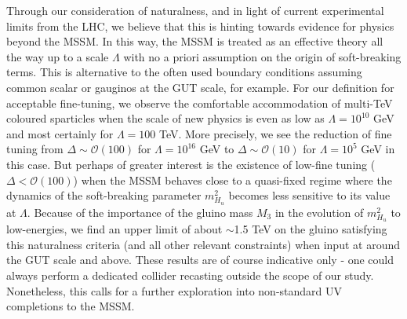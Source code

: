 Through our consideration of naturalness, and in light of current experimental limits from the LHC, we believe that this is hinting towards evidence for physics beyond the MSSM. In this way, the MSSM is treated as an effective theory all the way up to a scale $\Lambda$ with no a priori assumption on the origin of soft-breaking terms. This is alternative to the often used boundary conditions assuming common scalar or gauginos at the GUT scale, for example. For our definition for acceptable fine-tuning, we observe the comfortable accommodation of multi-TeV coloured sparticles when the scale of new physics is even as low as $\Lambda = 10^{10}$ GeV and most certainly for $\Lambda = 100$ TeV. More precisely, we see the reduction of fine tuning from $\Delta \sim \mathcal{O}(100)$ for $\Lambda = 10^{16}$ GeV to $\Delta \sim \mathcal{O}(10)$ for $\Lambda = 10^5$ GeV in this case. But perhaps of greater interest is the existence of low-fine tuning ($\Delta < \mathcal{O}(100)$) when the MSSM behaves close to a quasi-fixed regime where the dynamics of the soft-breaking parameter $m^2_{H_u}$ becomes less sensitive to its value at $\Lambda$. Because of the importance of the gluino mass $M_3$ in the evolution of $m^2_{H_u}$ to low-energies, we find an upper limit of about $\sim$1.5 TeV on the gluino satisfying this naturalness criteria (and all other relevant constraints) when input at around the GUT scale and above. These results are of course indicative only - one could always perform a dedicated collider recasting outside the scope of our study. Nonetheless, this calls for a further exploration into non-standard UV completions to the MSSM.

